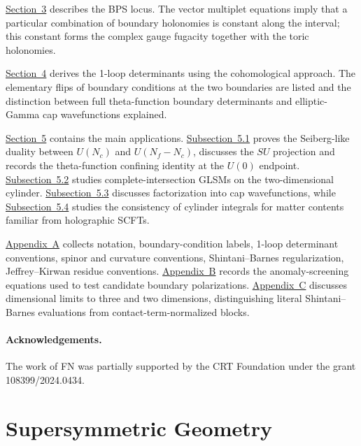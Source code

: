 \documentclass[11pt,a4paper]{article}
\numberwithin{equation}{section}
\theoremstyle{plain}
\theoremstyle{definition}
\theoremstyle{remark}
\begin{document}
\hyperref[sec:bps-loci]{Section~3} describes the BPS locus. The vector multiplet equations imply that a particular combination of boundary holonomies is constant along the interval; this constant forms the complex gauge fugacity together with the toric holonomies.

\hyperref[sec:oneloop]{Section~4} derives the 1-loop determinants using the cohomological approach.  The elementary flips of boundary conditions  at the two boundaries  are listed and the distinction between full theta-function boundary determinants and elliptic-Gamma cap wavefunctions explained.

\hyperref[sec:applications-examples]{Section~5} contains the main applications.  \hyperref[sec:duality]{Subsection~5.1} proves the Seiberg-like duality between \(U(N_c)\) and \(U(N_f-N_c)\), discusses the \(SU\) projection and records the theta-function confining identity at the \(U(0)\) endpoint.  \hyperref[sec:complete-intersections-cylinder]{Subsection~5.2} studies complete-intersection GLSMs on the two-dimensional cylinder.  \hyperref[sec:factorization-half-blocks]{Subsection~5.3} discusses factorization into cap wavefunctions, while \hyperref[sec:holographic-benchmarks]{Subsection~5.4} studies the consistency of cylinder integrals for matter contents familiar from holographic SCFTs.

\hyperref[app:notation-conventions]{Appendix~A} collects notation, boundary-condition labels, 1-loop determinant conventions, spinor and curvature conventions, Shintani--Barnes regularization, Jeffrey--Kirwan residue conventions.  \hyperref[app:anomalies]{Appendix~B} records the anomaly-screening equations used to test candidate boundary polarizations.  \hyperref[app:dimensional-limits]{Appendix~C} discusses dimensional limits to three and two dimensions, distinguishing literal Shintani--Barnes evaluations from contact-term-normalized blocks.


\paragraph{Acknowledgements.}

The work of FN was partially supported by the CRT Foundation under the grant 108399/2024.0434.


\section{Supersymmetric Geometry}\label{sec:geometry-loc}
\end{document}
